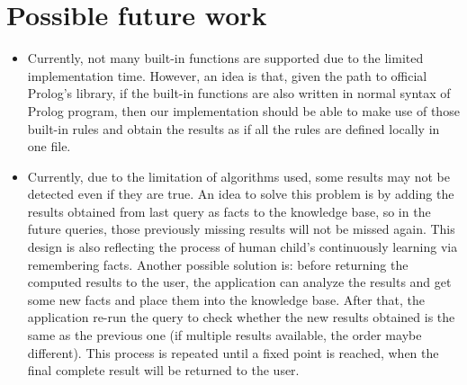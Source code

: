 \documentclass[11pt,a4paper]{report}
\begin{document}
\section*{Possible future work}
\begin{itemize}
	\item Currently, not many built-in functions are supported due to the limited implementation time. However, an idea is that, given the path to official Prolog's library, if the built-in functions are also written in normal syntax of Prolog program, then our implementation should be able to make use of those built-in rules and obtain the results as if all the rules are defined locally in one file.
	
	\item Currently, due to the limitation of algorithms used, some results may not be detected even if they are true. An idea to solve this problem is by adding the results obtained from last query as facts to the knowledge base, so in the future queries, those previously missing results will not be missed again. This design is also reflecting the process of  human child's continuously learning via remembering facts. Another possible solution is: before returning the computed results to the user, the application can analyze the results and get some new facts and place them into the knowledge base. After that, the application re-run the query to check whether the new results obtained is the same as the previous one (if multiple results available, the order maybe different). This process is repeated until a fixed point is reached, when the final complete result will be returned to the user. 
\end{itemize}






\end{document}
